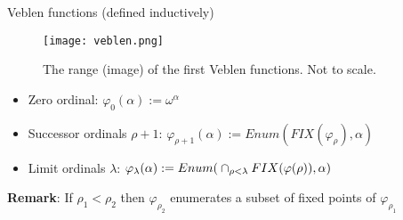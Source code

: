 \documentclass[10pt]{beamer}
\begin{document}
\begin{frame}{Veblen functions (defined inductively)}
\begin{figure}
\centering
\texttt{[image: veblen.png]}
\caption{The range (image) of the first Veblen functions. Not to scale.}
\end{figure}

\begin{itemize}
	\item Zero ordinal: $\varphi_0(\alpha) := \omega^\alpha$
	\item Successor ordinals $\rho + 1$: $\varphi_{\rho+1}(\alpha) := Enum(FIX(\varphi_\rho), \alpha)$
	\item Limit ordinals $\lambda$: $\varphi_{\lambda}(\alpha) := Enum\mathlarger{(}\cap_{\rho < \lambda} FIX(\varphi(\rho)),\alpha\mathlarger{)}$
\end{itemize}





\pause

\textbf{Remark}: If $\rho_1 < \rho_2$ then $\varphi_{\rho_2}$ enumerates a subset of fixed points of $\varphi_{\rho_1}$

\end{frame}
\end{document}
